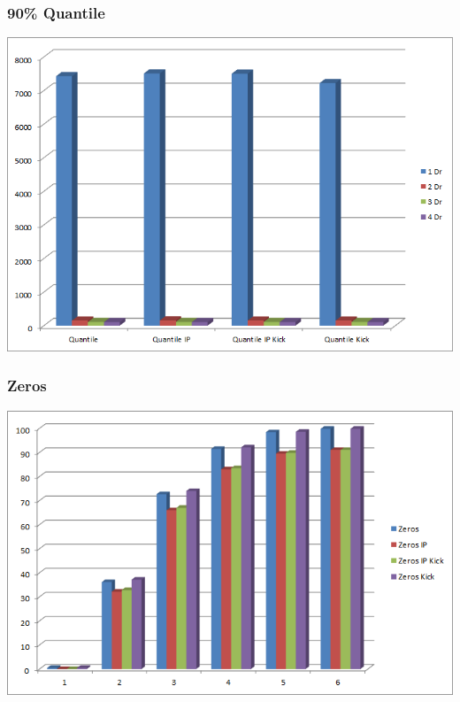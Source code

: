 \documentclass{beamer}
\begin{document}


\begin{frame}
	\frametitle{90\% Quantile}
	\begin{center}
		\includegraphics[scale=0.6]{img/Quantile.png}
	\end{center}
\end{frame}

\begin{frame}
	\frametitle{Zeros}
	\begin{center}
		\includegraphics[scale=0.6]{img/Zeros.png}
	\end{center}
\end{frame}
\end{document}
